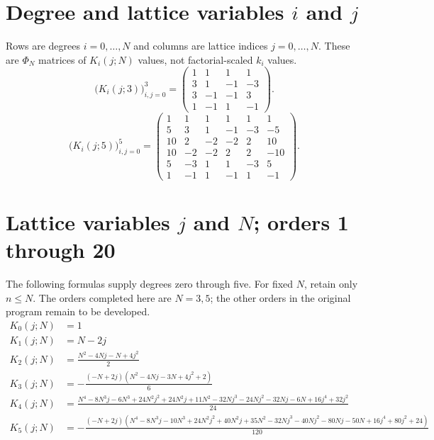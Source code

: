 \section{Degree and lattice variables $i$ and $j$}
Rows are degrees $i=0,\ldots,N$ and columns are lattice indices
$j=0,\ldots,N$. These are $\Phi_N$ matrices of $K_i(j;N)$ values,
not factorial-scaled $k_i$ values.
\begingroup
\small
\setlength{\arraycolsep}{3pt}
\[
\bigl(K_i(j;3)\bigr)_{i,j=0}^{3}=\begin{pmatrix}
1 & 1 & 1 & 1 \\
3 & 1 & -1 & -3 \\
3 & -1 & -1 & 3 \\
1 & -1 & 1 & -1
\end{pmatrix}.
\]
\endgroup
\begingroup
\small
\setlength{\arraycolsep}{3pt}
\[
\bigl(K_i(j;5)\bigr)_{i,j=0}^{5}=\begin{pmatrix}
1 & 1 & 1 & 1 & 1 & 1 \\
5 & 3 & 1 & -1 & -3 & -5 \\
10 & 2 & -2 & -2 & 2 & 10 \\
10 & -2 & -2 & 2 & 2 & -10 \\
5 & -3 & 1 & 1 & -3 & 5 \\
1 & -1 & 1 & -1 & 1 & -1
\end{pmatrix}.
\]
\endgroup
\section{Lattice variables $j$ and $N$; orders 1 through 20}
The following formulas supply degrees zero through five. For fixed $N$,
retain only $n\leq N$. The orders completed here are $N=3,5$;
the other orders in the original program remain to be developed.
\begin{align*}
K_{0}(j;N)&=1 \\
K_{1}(j;N)&=N - 2 j \\
K_{2}(j;N)&=\frac{N^{2} - 4 N j - N + 4 j^{2}}{2} \\
K_{3}(j;N)&=- \frac{\left(- N + 2 j\right) \left(N^{2} - 4 N j - 3 N + 4 j^{2} + 2\right)}{6} \\
K_{4}(j;N)&=\frac{N^{4} - 8 N^{3} j - 6 N^{3} + 24 N^{2} j^{2} + 24 N^{2} j + 11 N^{2} - 32 N j^{3} - 24 N j^{2} - 32 N j - 6 N + 16 j^{4} + 32 j^{2}}{24} \\
K_{5}(j;N)&=- \frac{\left(- N + 2 j\right) \left(N^{4} - 8 N^{3} j - 10 N^{3} + 24 N^{2} j^{2} + 40 N^{2} j + 35 N^{2} - 32 N j^{3} - 40 N j^{2} - 80 N j - 50 N + 16 j^{4} + 80 j^{2} + 24\right)}{120}
\end{align*}
